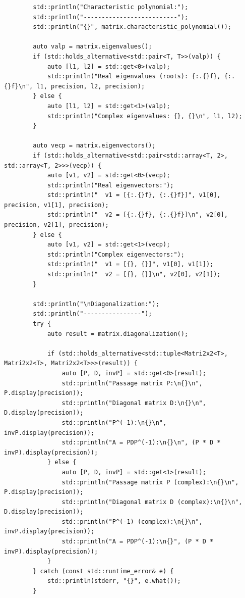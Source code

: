 \documentclass[11pt]{article}
\begin{document}
\begin{lstlisting}
        std::println("Characteristic polynomial:");
        std::println("--------------------------");
        std::println("{}", matrix.characteristic_polynomial());

        auto valp = matrix.eigenvalues();
        if (std::holds_alternative<std::pair<T, T>>(valp)) {
            auto [l1, l2] = std::get<0>(valp);
            std::println("Real eigenvalues (roots): {:.{}f}, {:.{}f}\n", l1, precision, l2, precision);
        } else {
            auto [l1, l2] = std::get<1>(valp);
            std::println("Complex eigenvalues: {}, {}\n", l1, l2);
        }

        auto vecp = matrix.eigenvectors();
        if (std::holds_alternative<std::pair<std::array<T, 2>, std::array<T, 2>>>(vecp)) {
            auto [v1, v2] = std::get<0>(vecp);
            std::println("Real eigenvectors:");
            std::println("  v1 = [{:.{}f}, {:.{}f}]", v1[0], precision, v1[1], precision);
            std::println("  v2 = [{:.{}f}, {:.{}f}]\n", v2[0], precision, v2[1], precision);
        } else {
            auto [v1, v2] = std::get<1>(vecp);
            std::println("Complex eigenvectors:");
            std::println("  v1 = [{}, {}]", v1[0], v1[1]);
            std::println("  v2 = [{}, {}]\n", v2[0], v2[1]);
        }

        std::println("\nDiagonalization:");
        std::println("----------------");
        try {
            auto result = matrix.diagonalization();
            
            if (std::holds_alternative<std::tuple<Matri2x2<T>, Matri2x2<T>, Matri2x2<T>>>(result)) {
                auto [P, D, invP] = std::get<0>(result);
                std::println("Passage matrix P:\n{}\n", P.display(precision));
                std::println("Diagonal matrix D:\n{}\n", D.display(precision));
                std::println("P^(-1):\n{}\n", invP.display(precision));
                std::println("A = PDP^(-1):\n{}\n", (P * D * invP).display(precision));
            } else {
                auto [P, D, invP] = std::get<1>(result);
                std::println("Passage matrix P (complex):\n{}\n", P.display(precision));
                std::println("Diagonal matrix D (complex):\n{}\n", D.display(precision));
                std::println("P^(-1) (complex):\n{}\n", invP.display(precision));
                std::println("A = PDP^(-1):\n{}", (P * D * invP).display(precision));
            }
        } catch (const std::runtime_error& e) {
            std::println(stderr, "{}", e.what());
        }


\end{lstlisting}
\end{document}
